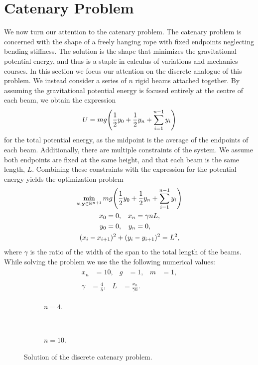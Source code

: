 \documentclass[11pt,a4paper,twocolumn]{article}
\let\originalleft\left
\let\originalright\right
\renewcommand{\left}{\mathopen{}\mathclose\bgroup\originalleft}
\renewcommand{\right}{\aftergroup\egroup\originalright}
\begin{document}
\section{Catenary Problem}
We now turn our attention to the catenary problem. The catenary problem is concerned with the shape of a freely hanging rope with fixed endpoints neglecting bending stiffness. The solution is the shape that minimizes the gravitational potential energy, and thus is a staple in calculus of variations and mechanics courses. In this section we focus our attention on the discrete analogue of this problem. We instead consider a series of $n$ rigid beams attached together. By assuming the gravitational potential energy is focused entirely at the centre of each beam, we obtain the expression
\begin{align}
	U = m g \left( \frac{1}{2} y_0 + \frac{1}{2} y_n + \sum_{i = 1}^{n-1} y_i \right)
\end{align}
for the total potential energy, as the midpoint is the average of the endpoints of each beam. Additionally, there are multiple constraints of the system. We assume both endpoints are fixed at the same height, and that each beam is the same length, $L$. Combining these constraints with the expression for the potential energy yields the optimization problem
\begin{gather}
	\min_{\mathbf{x}, \mathbf{y} \in \mathbb{R}^{n+1}} m g \left( \frac{1}{2} y_0 + \frac{1}{2} y_n + \sum_{i = 1}^{n-1} y_i \right) \\
	\begin{align}
		x_0 &= 0, & x_n &= \gamma n L, \nonumber \\
		y_0 &=0, & y_n &= 0,
	\end{align} \\
	(x_i - x_{i+1})^2 + (y_i - y_{i+1})^2 = L^2, \nonumber
\end{gather}
where $\gamma$ is the ratio of the width of the span to the total length of the beams. While solving the problem we use the the following numerical values:
\begin{gather}
	\begin{align}
		x_n &= 10, & g &= 1, & m &= 1,
	\end{align} \\
	\begin{align}
		\gamma &= \frac{4}{5}, & L &= \frac{x_n}{\gamma n}.
	\end{align}
\end{gather}

\begin{figure*}[tbp]
	\centering
	\begin{subfigure}{\textwidth}
		\centering
		
		\caption{$n = 4$.}
		\label{fig:beam4}
	\end{subfigure} \\
	\begin{subfigure}{\textwidth}
		\centering
		
		\caption{$n = 10$.}
		\label{fig:beam10}	
	\end{subfigure}
	\caption{Solution of the discrete catenary problem.}
	\label{fig:catenary}
\end{figure*}
\end{document}
